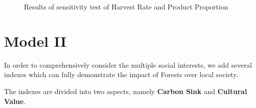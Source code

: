 \documentclass{mcmthesis}
\numberwithin{figure}{section}
\numberwithin{table}{section}
\numberwithin{equation}{section}
\begin{document}
\begin{figure}[htbp]
  \centering

\caption{Results of sensitivity test of Harvest Rate and Product Proportion}
\end{figure}






\newpage




\section{Model II}

In order to comprehensively consider the multiple social interests, we add
several indexes which can fully demonstrate the impact of Forests over local 
society. 
\par
The indexes are divided into two aspects, namely \textbf{Carbon Sink} and \textbf{Cultural Value}.
\end{document}
